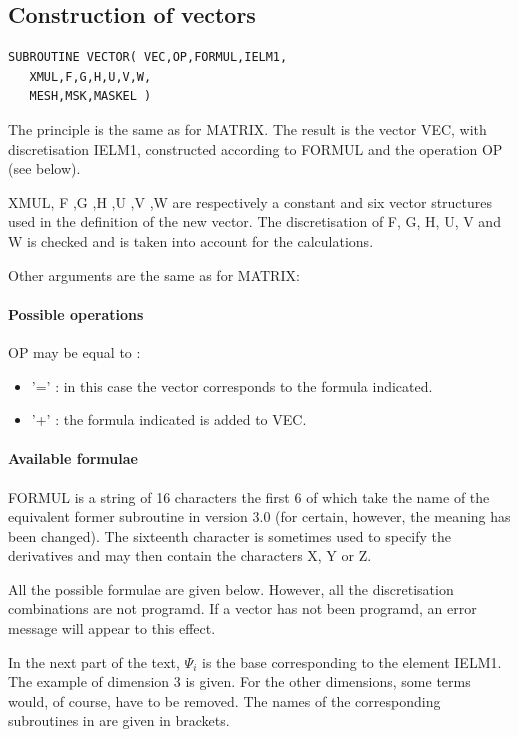 \subsection{Construction of vectors}

\begin{lstlisting}[language=TelFortran]
SUBROUTINE VECTOR( VEC,OP,FORMUL,IELM1,
   XMUL,F,G,H,U,V,W,
   MESH,MSK,MASKEL )
\end{lstlisting}

The principle is the same as for MATRIX. The result is the vector VEC, with
discretisation IELM1, constructed according to FORMUL and the operation OP (see
below).

XMUL, F ,G ,H ,U ,V ,W are respectively a constant and six vector structures
used in the definition of the new vector. The discretisation of F, G, H, U, V
and W is checked and is taken into account for the calculations.

Other arguments are the same as for MATRIX:

\paragraph{Possible operations}

OP may be equal to :
\begin{itemize}
  \item '=' : in this case the vector corresponds to the formula indicated.
  \item '+' : the formula indicated is added to VEC.
\end{itemize}

\paragraph{Available formulae}

FORMUL is a string of 16 characters the first 6 of which take the name of the
equivalent former subroutine in \bief version 3.0 (for certain, however, the
meaning has been changed). The sixteenth character is sometimes used to specify
the derivatives and may then contain the characters X, Y or Z.

All the possible formulae are given below. However, all the discretisation
combinations are not programd. If a vector has not been programd, an error
message will appear to this effect.

In the next part of the text, $\Psi _{i} $ is the base corresponding to the
element IELM1. The example of dimension 3 is given. For the other dimensions,
some terms would, of course, have to be removed. The names of the corresponding
subroutines in  are given in brackets.

